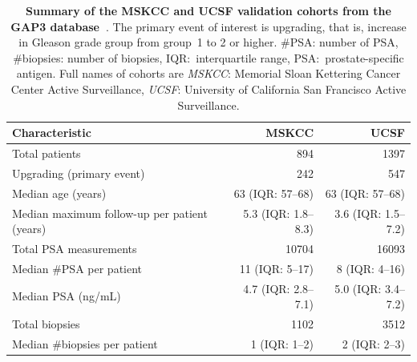 \begin{subappendices}
\begin{table}
\small
\centering
\caption{\textbf{Summary of the MSKCC and UCSF validation cohorts from the GAP3 database~\citep{gap3_2018}}. The primary event of interest is upgrading, that is, increase in Gleason grade group from group~1 to 2 or higher. \#PSA: number of PSA, \#biopsies: number of biopsies, IQR:~interquartile range, PSA:~prostate-specific antigen. Full names of cohorts are \textit{MSKCC}: Memorial Sloan Kettering Cancer Center Active Surveillance, \textit{UCSF}: University of California San Francisco Active Surveillance.}
\label{c5:tab:gap3_summary_2}
\begin{tabular}{p{5cm}rr}
\hline
\textbf{Characteristic} & \textbf{MSKCC} & \textbf{UCSF}\\
\hline
Total patients & 894 & 1397 \\
Upgrading (primary event) & 242 & 547\\
\hline
Median age (years) & 63 (IQR: 57--68) & 63 (IQR: 57--68)\\
Median maximum follow-up per patient (years) & 5.3 (IQR: 1.8--8.3) & 3.6 (IQR: 1.5--7.2)\\
Total PSA measurements & 10704 & 16093\\
Median \#PSA per patient & 11 (IQR: 5--17) & 8 (IQR: 4--16)\\
Median PSA (ng/mL) & 4.7 (IQR: 2.8--7.1) & 5.0 (IQR: 3.4--7.2)\\
Total biopsies & 1102 & 3512\\
Median \#biopsies per patient & 1 (IQR: 1--2) & 2 (IQR: 2--3)\\
\hline
\end{tabular}
\end{table}


\end{subappendices}
